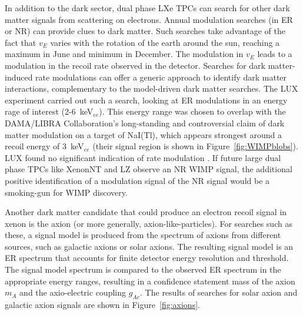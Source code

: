 In addition to the dark sector, dual phase \ac{LXe} \ac{TPC}s can search for other dark matter signals from scattering on electrons. Annual modulation searches (in \ac{ER} or \ac{NR}) can provide clues to dark matter. Such searches take advantage of the fact that $v_{E}$ varies with the rotation of the earth around the sun, reaching a maximum in June and minimum in December. The modulation in $v_{E}$ leads to a modulation in the recoil rate observed in the detector. Searches for dark matter-induced rate modulations can offer a generic approach to identify dark matter interactions, complementary to the model-driven dark matter searches. The \ac{LUX} experiment carried out such a search, looking at \ac{ER} modulations in an energy rage of interest (2-6~keV$_{ee}$). This energy range was chosen to overlap with the DAMA/LIBRA Collaboration's long-standing and controversial claim of dark matter modulation on a target of NaI(Tl), which appears strongest around a recoil energy of 3~keV$_{ee}$ (their signal region is shown in Figure~\ref{fig:WIMPblobs}). \ac{LUX} found no significant indication of rate modulation \cite{LUXModulation}. If future large dual phase \ac{TPC}s like XenonNT and LZ observe an \ac{NR} \ac{WIMP} signal, the additional positive identification of a modulation signal of the \ac{NR} signal would be a smoking-gun for \ac{WIMP} discovery. 

Another dark matter candidate that could produce an electron recoil signal in xenon is the axion (or more generally, axion-like-particles). For searches such as these, a signal model is produced from the spectrum of axions from different sources, such as galactic axions or solar axions. The resulting signal model is an \ac{ER} spectrum that accounts for finite detector energy resolution and threshold. The signal model spectrum is compared to the observed \ac{ER} spectrum in the appropriate energy ranges, resulting in a confidence statement mass of the axion $m_{A}$ and the axio-electric coupling $g_{Ae}$. The results of searches for solar axion and galactic axion signals are shown in Figure~\ref{fig:axions}.

